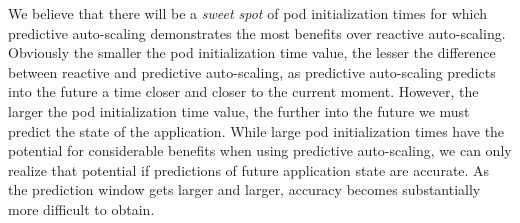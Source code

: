 We believe that there will be a \textit{sweet spot} of pod initialization times
for which predictive auto-scaling demonstrates the most benefits over reactive
auto-scaling. Obviously the smaller the pod initialization time value, the lesser
the difference between reactive and predictive auto-scaling, as predictive
auto-scaling predicts into the future a time closer and closer to the current
moment. However, the larger the pod initialization time value, the further into
the future we must predict the state of the application. While large pod
initialization times have the potential for considerable benefits when using
predictive auto-scaling, we can only realize that potential if predictions of
future application state are accurate. As the prediction window gets larger and
larger, accuracy becomes substantially more difficult to obtain.
